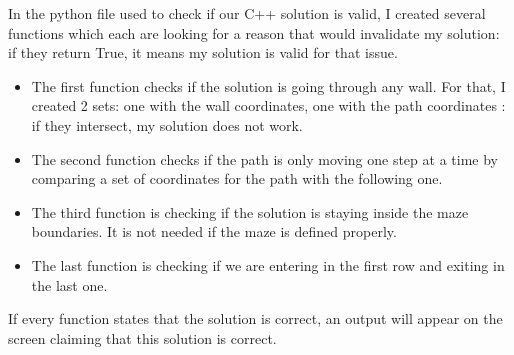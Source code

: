 \documentclass{article}
\begin{document}
\noindent
In the python file used to check if our C++ solution 
is valid, I created several functions which each 
are looking for a reason that would invalidate 
my solution: if they return True, it means my solution 
is valid for that issue.
\begin{itemize}
    \item The first function checks if the solution 
is going through any wall. For that, I created 2 sets: 
one with the wall coordinates, one with the path coordinates
: if they intersect, my solution does not work.
    \item The second function checks if the path is 
only moving one step at a time by comparing a set of 
coordinates for the path with the following one.
    \item The third function is checking if the solution 
is staying inside the maze boundaries. It is not needed 
if the maze is defined properly.
    \item The last function is checking if we are entering
 in the first row and exiting in the last one.
\end{itemize}
\newline

\noindent
If every function states that the solution is correct, an 
output will appear on the screen claiming that this solution 
is correct.
\end{document}
